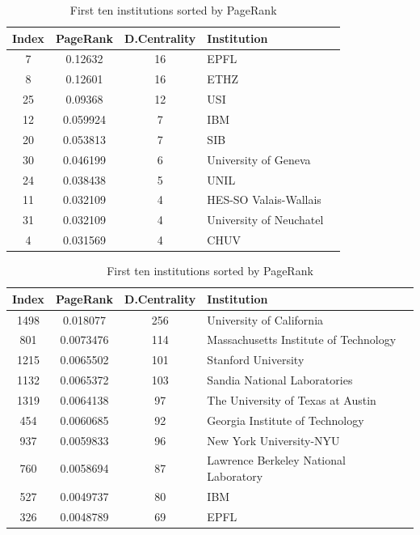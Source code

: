 \documentclass[]{usiinfbachelorproject}
\begin{document}
\begin{table}[h!]
\begin{minipage}[b]{.5\linewidth}
\tiny
\begin{tabular}{c c c l l}
\textbf{Index} & \textbf{PageRank} & \textbf{D.Centrality} & \textbf{Institution}\\
\hline
7 & 0.12632 & 16 & EPFL \\
8 & 0.12601 & 16 & ETHZ \\
25 & 0.09368 & 12 & USI \\
12 & 0.059924 & 7 & IBM \\
20 & 0.053813 & 7 & SIB \\
30 & 0.046199 & 6 & University of Geneva \\
24 & 0.038438 & 5 & UNIL \\
11 & 0.032109 & 4 & HES-SO Valais-Wallais\\
31 & 0.032109 & 4 & University of Neuchatel \\
4 & 0.031569 & 4 & CHUV
\end{tabular}
\label{table:PR}
\caption{First ten Swiss institutions sorted by PageRank}
\end{minipage}
\begin{minipage}[b]{.5\linewidth}
\tiny
\begin{tabular}{c c c l l}
\textbf{Index} & \textbf{PageRank} & \textbf{D.Centrality} & \textbf{Institution}\\
\hline
1498 & 0.018077 & 256 & University of California \\
801 & 0.0073476 & 114 & Massachusetts Institute of Technology \\
1215 & 0.0065502 & 101 & Stanford University \\
1132 & 0.0065372 & 103 & Sandia National Laboratories \\
1319 & 0.0064138 & 97 & The University of Texas at Austin \\
454 & 0.0060685 & 92 & Georgia Institute of Technology \\
937 & 0.0059833 & 96 & New York University-NYU \\
760 & 0.0058694 & 87 & Lawrence Berkeley National Laboratory\\
527 & 0.0049737 & 80 & IBM \\
326 & 0.0048789 & 69 & EPFL
\end{tabular}
\label{table:DC}
\caption{First ten institutions sorted by PageRank}
\end{minipage}
\end{table}
\end{document}
